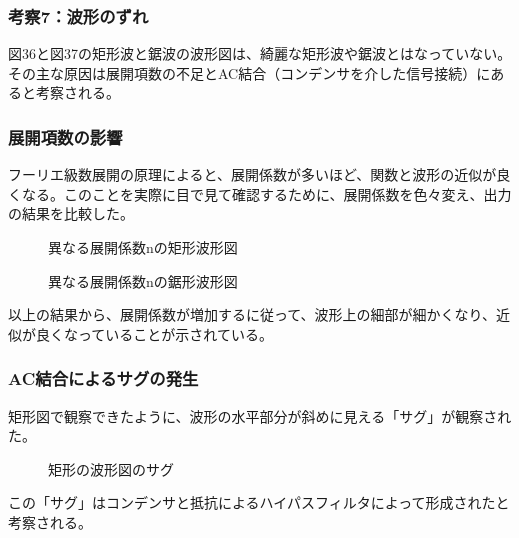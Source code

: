 \documentclass{article}
\begin{document}
\subsubsection{考察7：波形のずれ}
\begin{spacing}{1.2}
    図36と図37の矩形波と鋸波の波形図は、綺麗な矩形波や鋸波とはなっていない。その主な原因は展開項数の不足とAC結合（コンデンサを介した信号接続）にあると考察される。
    \subsubsection*{展開項数の影響}
    フーリエ級数展開の原理によると、展開係数が多いほど、関数と波形の近似が良くなる。このことを実際に目で見て確認するために、展開係数を色々変え、出力の結果を比較した。
    \begin{figure}[ht] %
        \centering
        \caption{異なる展開係数nの矩形波形図}
    \end{figure}
    \begin{figure}[ht] %
        \centering
        \caption{異なる展開係数nの鋸形波形図}
    \end{figure}
    \FloatBarrier
    以上の結果から、展開係数が増加するに従って、波形上の細部が細かくなり、近似が良くなっていることが示されている。
    \vspace{50pt} %
    \subsubsection*{AC結合によるサグの発生}
    矩形図で観察できたように、波形の水平部分が斜めに見える「サグ」が観察された。
    \begin{figure}[ht] %
        \centering
        \caption{矩形の波形図のサグ}
    \end{figure}
    \FloatBarrier
    この「サグ」はコンデンサと抵抗によるハイパスフィルタによって形成されたと考察される。


\end{spacing}
\end{document}
